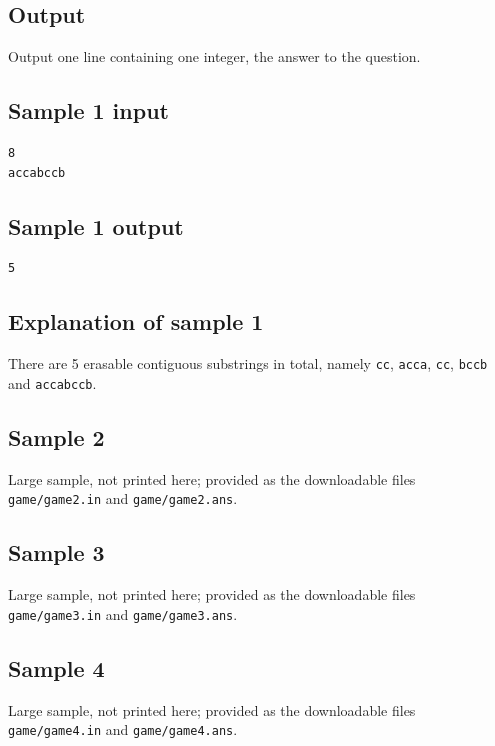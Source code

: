 \documentclass[11pt]{article}
\begin{document}
\subsection*{Output}

Output one line containing one integer, the answer to the question.

\subsection*{Sample 1 input}

\begin{verbatim}
8
accabccb
\end{verbatim}

\subsection*{Sample 1 output}

\begin{verbatim}
5
\end{verbatim}

\subsection*{Explanation of sample 1}

There are 5 erasable contiguous substrings in total, namely
\texttt{cc}, \texttt{acca}, \texttt{cc}, \texttt{bccb} and
\texttt{accabccb}.

\subsection*{Sample 2}

Large sample, not printed here;
provided as the downloadable files \texttt{game/game2.in} and \texttt{game/game2.ans}.

\subsection*{Sample 3}

Large sample, not printed here;
provided as the downloadable files \texttt{game/game3.in} and \texttt{game/game3.ans}.

\subsection*{Sample 4}

Large sample, not printed here;
provided as the downloadable files \texttt{game/game4.in} and \texttt{game/game4.ans}.
\end{document}
